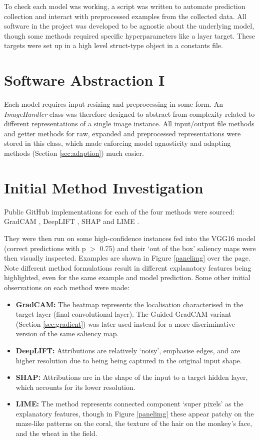 \documentclass[main]{subfiles}
\begin{document}
To check each model was working, a script was written to automate prediction collection and interact with preprocessed examples from the collected data. All software in the project was developed to be agnostic about the underlying model, though some methods required specific hyperparameters like a layer target. These targets were set up in a high level struct-type object in a constants file.

\section{Software Abstraction I}  \label{sec:sw1}

Each model requires input resizing and preprocessing in some form. An \textit{ImageHandler} class was therefore designed to abstract from complexity related to different representations of a single image instance. All input/output file methods and getter methods for raw, expanded and preprocessed representations were stored in this class, which made enforcing model agnosticity and adapting methods (Section \ref{sec:adaption}) much easier.


\newpage
\section{Initial Method Investigation}  \label{sec:initial}

Public GitHub implementations for each of the four methods were sourced: GradCAM \cite{gradcamrepo}, DeepLIFT \cite{deepliftwrapperrepo}, SHAP \cite{shaprepo} and LIME \cite{limerepo}.

They were then run on some high-confidence instances fed into the VGG16 model (correct predictions with p $>$ 0.75) and their `out of the box' saliency maps were then visually inspected. Examples are shown in Figure \ref{panelimg} over the page. Note  different method formulations result in different explanatory features being highlighted, even for the same example and model prediction. Some other initial observations on each method were made:

\begin{itemize}
\item \textbf{GradCAM:} The heatmap represents the localisation characterised in the target layer (final convolutional layer). The Guided GradCAM variant (Section \ref{sec:gradient}) was later used instead for a more discriminative version of the same saliency map.
\item \textbf{DeepLIFT:} Attributions are relatively `noisy', emphasise edges, and are higher resolution due to being being captured in the original input shape.
\item \textbf{SHAP:} Attributions are in the shape of the input to a target hidden layer, which accounts for its lower resolution. 
\item \textbf{LIME:} The method represents connected component `super pixels' as the explanatory features, though in Figure \ref{panelimg} these appear patchy on the maze-like patterns on the coral, the texture of the hair on the monkey's face, and the wheat in the field.
\end{itemize}
\end{document}
